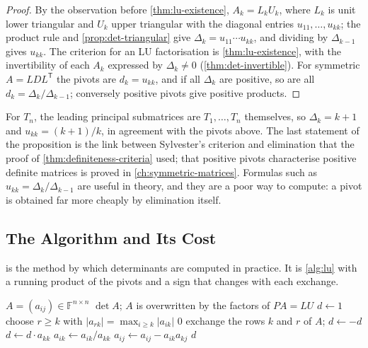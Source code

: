 \begin{proof}
By the observation before \cref{thm:lu-existence}, $A_k=L_kU_k$, where $L_k$ is unit lower triangular and $U_k$ upper triangular with the diagonal entries $u_{11},\ldots,u_{kk}$; the product rule and \cref{prop:det-triangular} give $\Delta_k=u_{11}\cdots u_{kk}$, and dividing by $\Delta_{k-1}$ gives $u_{kk}$. The criterion for an LU factorisation is \cref{thm:lu-existence}, with the invertibility of each $A_k$ expressed by $\Delta_k\ne0$ (\cref{thm:det-invertible}). For symmetric $A=LDL^{\mathsf T}$ the pivots are $d_k=u_{kk}$, and if all $\Delta_k$ are positive, so are all $d_k=\Delta_k/\Delta_{k-1}$; conversely positive pivots give positive products.
\end{proof}

For $T_n$, the leading principal submatrices are $T_1,\ldots,T_n$ themselves, so $\Delta_k=k+1$ and $u_{kk}=(k+1)/k$, in agreement with the pivots above. The last statement of the proposition is the link between Sylvester's criterion and elimination that the proof of \cref{thm:definiteness-criteria} used; that positive pivots characterise positive definite matrices is proved in \cref{ch:symmetric-matrices}. Formulas such as $u_{kk}=\Delta_k/\Delta_{k-1}$ are useful in theory, and they are a poor way to compute: a pivot is obtained far more cheaply by elimination itself.

\subsection{The Algorithm and Its Cost}

 is the method by which determinants are computed in practice. It is \cref{alg:lu} with a running product of the pivots and a sign that changes with each exchange.

\begin{algorithm}
\begin{algorithmic}[1]
\Require $A=(a_{ij})\in\mathbb F^{n\times n}$
\Ensure $\det A$; $A$ is overwritten by the factors of $PA=LU$
\State $d\gets1$
  \State choose $r\ge k$ with $|a_{rk}|=\max_{i\ge k}|a_{ik}|$
   
    \State \Return $0$
  \EndIf
    \State exchange the rows $k$ and $r$ of $A$; $d\gets-d$
  \EndIf
  \State $d\gets d\cdot a_{kk}$
    \State $a_{ik}\gets a_{ik}/a_{kk}$
      \State $a_{ij}\gets a_{ij}-a_{ik}a_{kj}$
    \EndFor
  \EndFor
\EndFor
\State \Return $d$
\end{algorithmic}
\caption{The determinant by Gaussian elimination with partial pivoting (\cref{thm:det-plu}). The work is that of \cref{alg:lu}, about $2n^3/3$ operations, plus one multiplication by each pivot.}
\label{alg:det-lu}
\end{algorithm}

